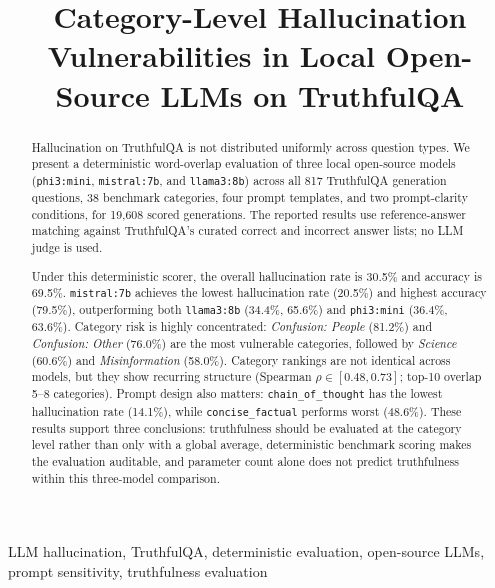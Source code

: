 \documentclass[conference]{IEEEtran}
\begin{document}
\title{Category-Level Hallucination Vulnerabilities in Local Open-Source LLMs on TruthfulQA}

\author{
}

\maketitle

\begin{abstract}
Hallucination on TruthfulQA is not distributed uniformly across question types. We present a deterministic word-overlap evaluation of three local open-source models (\texttt{phi3:mini}, \texttt{mistral:7b}, and \texttt{llama3:8b}) across all 817 TruthfulQA generation questions, 38 benchmark categories, four prompt templates, and two prompt-clarity conditions, for 19,608 scored generations. The reported results use reference-answer matching against TruthfulQA's curated correct and incorrect answer lists; no LLM judge is used.

Under this deterministic scorer, the overall hallucination rate is 30.5\% and accuracy is 69.5\%. \texttt{mistral:7b} achieves the lowest hallucination rate (20.5\%) and highest accuracy (79.5\%), outperforming both \texttt{llama3:8b} (34.4\%, 65.6\%) and \texttt{phi3:mini} (36.4\%, 63.6\%). Category risk is highly concentrated: \textit{Confusion: People} (81.2\%) and \textit{Confusion: Other} (76.0\%) are the most vulnerable categories, followed by \textit{Science} (60.6\%) and \textit{Misinformation} (58.0\%). Category rankings are not identical across models, but they show recurring structure (Spearman $\rho \in [0.48, 0.73]$; top-10 overlap 5--8 categories). Prompt design also matters: \texttt{chain\_of\_thought} has the lowest hallucination rate (14.1\%), while \texttt{concise\_factual} performs worst (48.6\%). These results support three conclusions: truthfulness should be evaluated at the category level rather than only with a global average, deterministic benchmark scoring makes the evaluation auditable, and parameter count alone does not predict truthfulness within this three-model comparison.
\end{abstract}

\begin{IEEEkeywords}
LLM hallucination, TruthfulQA, deterministic evaluation, open-source LLMs, prompt sensitivity, truthfulness evaluation
\end{IEEEkeywords}
\end{document}
